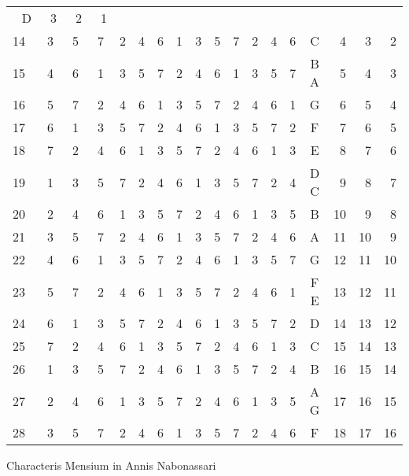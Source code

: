 \begin{tabnums}
\begin{tabular}[c]{@{} r  c c c c c c c c c c c c c  c c c c @{}}
 D  & ~3 & ~2 & ~1 \\
%
14~ &
3 & 5 & 7 & 2 & 4 & 6 & 1 & 3 & 5 & 7 & 2 & 4 & 6 &
 C  & ~4 & ~3 & ~2 \\
%
15~ &
4 & 6 & 1 & 3 & 5 & 7 & 2 & 4 & 6 & 1 & 3 & 5 & 7 &
B A & ~5 & ~4 & ~3 \\
%
16~ &
5 & 7 & 2 & 4 & 6 & 1 & 3 & 5 & 7 & 2 & 4 & 6 & 1 &
 G  & ~6 & ~5 & ~4 \\
%
17~ &
6 & 1 & 3 & 5 & 7 & 2 & 4 & 6 & 1 & 3 & 5 & 7 & 2 &
 F  & ~7 & ~6 & ~5 \\
%
18~ &
7 & 2 & 4 & 6 & 1 & 3 & 5 & 7 & 2 & 4 & 6 & 1 & 3 &
 E  & ~8 & ~7 & ~6 \\
%
19~ &
1 & 3 & 5 & 7 & 2 & 4 & 6 & 1 & 3 & 5 & 7 & 2 & 4 &
D C & ~9 & ~8 & ~7 \\
%
20~ &
2 & 4 & 6 & 1 & 3 & 5 & 7 & 2 & 4 & 6 & 1 & 3 & 5 &
 B  & 10 & ~9 & ~8 \\
%
21~ &
3 & 5 & 7 & 2 & 4 & 6 & 1 & 3 & 5 & 7 & 2 & 4 & 6 &
 A  & 11 & 10 & ~9 \\
%
22~ &
4 & 6 & 1 & 3 & 5 & 7 & 2 & 4 & 6 & 1 & 3 & 5 & 7 &
 G  & 12 & 11 & 10 \\
%
23~ &
5 & 7 & 2 & 4 & 6 & 1 & 3 & 5 & 7 & 2 & 4 & 6 & 1 &
F E & 13 & 12 & 11 \\
%
24~ &
6 & 1 & 3 & 5 & 7 & 2 & 4 & 6 & 1 & 3 & 5 & 7 & 2 &
 D  & 14 & 13 & 12 \\
%
25~ &
7 & 2 & 4 & 6 & 1 & 3 & 5 & 7 & 2 & 4 & 6 & 1 & 3 &
 C  & 15 & 14 & 13 \\
%
26~ &
1 & 3 & 5 & 7 & 2 & 4 & 6 & 1 & 3 & 5 & 7 & 2 & 4 &
 B  & 16 & 15 & 14 \\
%
27~ &
2 & 4 & 6 & 1 & 3 & 5 & 7 & 2 & 4 & 6 & 1 & 3 & 5 &
A G & 17 & 16 & 15 \\
%
28~ &
3 & 5 & 7 & 2 & 4 & 6 & 1 & 3 & 5 & 7 & 2 & 4 & 6 &
 F  & 18 & 17 & 16 \\
%
\bottomrule
\end{tabular}
%
\caption{Characteris Mensium in Annis Nabonassari}
\label{tab:p200}
%
\end{tabnums}
